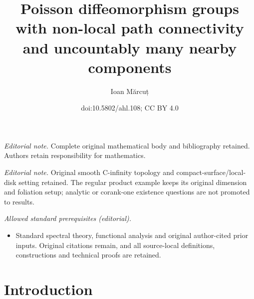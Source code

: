 \documentclass[10pt]{amsart}
\title{Poisson diffeomorphism groups with non-local path connectivity and uncountably many nearby components}
\author{Ioan Mărcuț}
\date{doi:10.5802/ahl.108; CC BY 4.0}
\theoremstyle{definition}
\begin{document}
\maketitle
\noindent\textit{Editorial note.} Complete original mathematical body and bibliography retained. Authors retain responsibility for mathematics.\par\medskip
\noindent\textit{Editorial note.} Original smooth C-infinity topology and compact-surface/local-disk setting retained. The regular product example keeps its original dimension and foliation setup; analytic or corank-one existence questions are not promoted to results.\par\medskip
\noindent\textit{Allowed standard prerequisites (editorial).}\begin{itemize}
\item Standard spectral theory, functional analysis and original author-cited prior inputs. Original citations remain, and all source-local definitions, constructions and technical proofs are retained.
\end{itemize}\medskip
\section*{Introduction}
\end{document}
